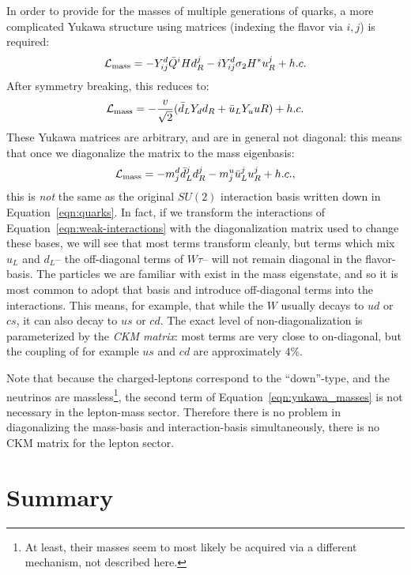 In order to provide for the masses of multiple generations of quarks, a more complicated Yukawa structure using matrices (indexing the flavor via $i,j$) is required:
%
\begin{equation}
\label{eqn:yukawa_masses}
\mathcal{L}_\mathrm{mass} = -Y_{ij}^d \bar{Q}^i H d_R^j - i Y_{ij}^d \sigma_2 H^* u_R^j + h.c.
\end{equation}
%
After symmetry breaking, this reduces to:
%
\begin{equation}
\mathcal{L}_\mathrm{mass} = - \frac{v}{\sqrt{2}} (\bar{d}_L Y_d d_R + \bar{u}_L Y_u uR) + h.c.
\end{equation}
%
These Yukawa matrices are arbitrary, and are in general not diagonal: this means that once we diagonalize the matrix to the mass eigenbasis:
%
\begin{equation}
\mathcal{L}_\mathrm{mass} = - m_j^d \bar{d}^j_L d^j_R - m_j^u \bar{u}_L^j u^j_R + h.c.,
\end{equation}
%
this is \textit{not} the same as the original $SU(2)$ interaction basis written down in Equation~\ref{eqn:quarks}. In fact, if we transform the interactions of Equation~\ref{eqn:weak-interactions} with the diagonalization matrix used to change these bases, we will see that most terms transform cleanly, but terms which mix $u_L$ and $d_L$-- the off-diagonal terms of $W\tau$-- will not remain diagonal in the flavor-basis. The particles we are familiar with exist in the mass eigenstate, and so it is most common to adopt that basis and introduce off-diagonal terms into the interactions. This means, for example, that while the $W$ usually decays to $ud$ or $cs$, it can also decay to $us$ or $cd$. The exact level of non-diagonalization is parameterized by the \textit{CKM matrix}: most terms are very close to on-diagonal, but the coupling of for example $us$ and $cd$ are approximately $4\%$.

Note that because the charged-leptons correspond to the ``down''-type, and the neutrinos are massless\footnote{At least, their masses seem to most likely be acquired via a different mechanism, not described here.}, the second term of Equation~\ref{eqn:yukawa_masses} is not necessary in the lepton-mass sector. Therefore there is no problem in diagonalizing the mass-basis and interaction-basis simultaneously, there is no CKM matrix for the lepton sector.


\section{Summary}


